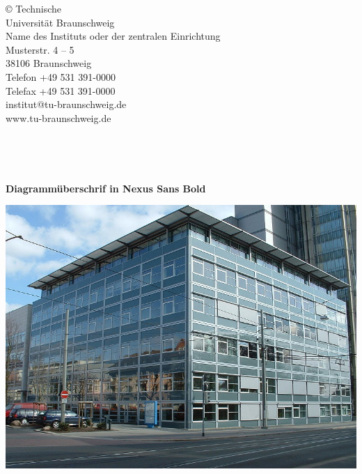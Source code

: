 \documentclass[a4paper,bcor=0mm,9pt,parskip=full,twoside]{tubsartcl}
\begin{document}
\begin{gaussbox}[bgcolor=tuGreenLight]{1}{1}{6}{8}
© Technische\\
Universität Braunschweig\\
Name des Instituts oder der zentralen Einrichtung\\
Musterstr. 4 – 5\\
38106 Braunschweig\\
Telefon +49 531 391-0000\\
Telefax +49 531 391-0000\\
institut@tu-braunschweig.de\\
www.tu-braunschweig.de
\end{gaussbox}
~\clearpage

\vspace*{2.5cm}
\setlength\postmulticols{0mm}
\begin{minipage}{\textwidth}
\begin{multicols}{2}
\lipsum[2]\par~\par\columnbreak
\lipsum[4]\par
\end{multicols}
\end{minipage}
\vspace*{0.5cm}
\begin{multicols*}{2}
\bfseries\sffamily Diagrammüberschrif in Nexus Sans Bold\par
\includegraphics[width=\linewidth]{infozentrum}
\end{multicols*}
\clearpage
\end{document}
